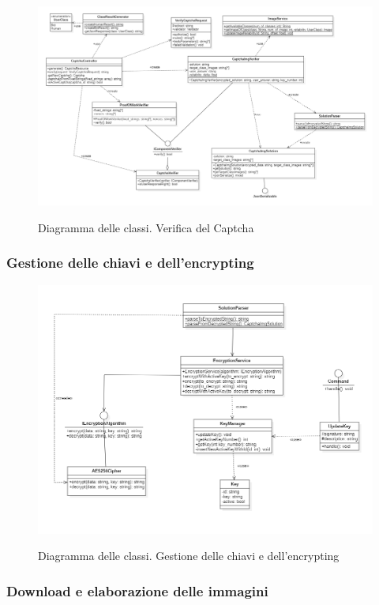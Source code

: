 \begin{figure}[H]
	\centering
	\includegraphics[scale = 0.45]{img/verify.png}\\
	\caption{Diagramma delle classi. Verifica del Captcha}
\end{figure}
\newpage

\subsubsection{Gestione delle chiavi e dell'encrypting}

\begin{figure}[H]
	\centering
	\includegraphics[scale = 0.55]{img/key_manager.png}\\
	\caption{Diagramma delle classi. Gestione delle chiavi e dell'encrypting}
\end{figure}
\newpage

\subsubsection{Download e elaborazione delle immagini}

